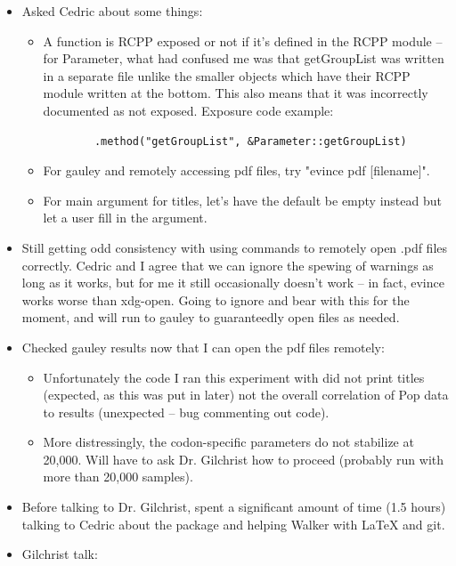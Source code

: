 \documentclass[12pt,hyperref]{labbook}
\begin{document}

\begin{itemize}
    \item Asked Cedric about some things:
    \begin{itemize}
        \item A function is RCPP exposed or not if it's defined in the RCPP module -- 
        for Parameter, what had confused me was that getGroupList was written in a separate file
        unlike the smaller objects which have their RCPP module written at the bottom.
        This also means that it was incorrectly documented as not exposed.
        Exposure code example:
        \begin{lstlisting}
        .method("getGroupList", &Parameter::getGroupList)
        \end{lstlisting}
        \item For gauley and remotely accessing pdf files, try "evince pdf [filename]".
        \item For main argument for titles, let's have the default be empty instead but let a user          fill in the argument.
    \end{itemize}
    \item Still getting odd consistency with using commands to remotely open .pdf files correctly.
    Cedric and I agree that we can ignore the spewing of warnings as long as it works, but for me it still occasionally doesn't work -- in fact, evince works worse than xdg-open.
    Going to ignore and bear with this for the moment, and will run to gauley to guaranteedly open files as needed.
    \item Checked gauley results now that I can open the pdf files remotely:
    \begin{itemize}
        \item Unfortunately the code I ran this experiment with did not print titles (expected, as this was put in later) not the overall correlation of Pop data to results (unexpected -- bug commenting out code).
        \item More distressingly, the codon-specific parameters do not stabilize at 20,000. Will have to ask Dr. Gilchrist how to proceed (probably run with more than 20,000 samples).
    \end{itemize}
    \item Before talking to Dr. Gilchrist, spent a significant amount of time (1.5 hours) talking to Cedric about the package and helping Walker with LaTeX and git.
    \item Gilchrist talk:

\end{itemize}
\end{document}
